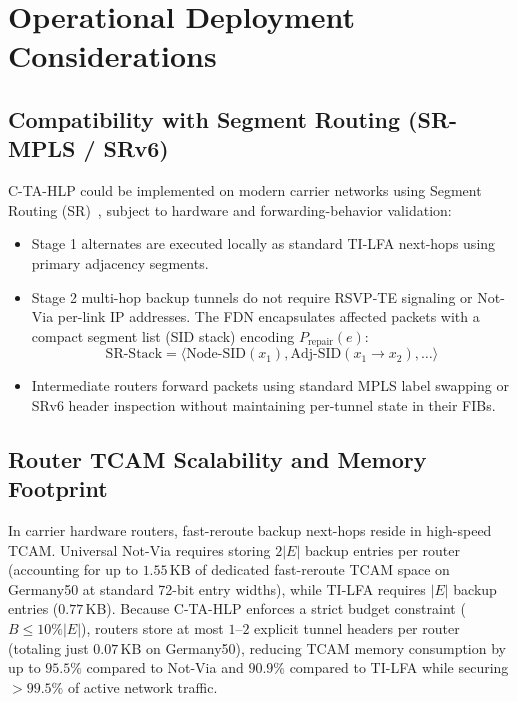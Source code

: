 \documentclass[journal]{IEEEtran}
\begin{document}
\section{Operational Deployment Considerations}

\subsection{Compatibility with Segment Routing (SR-MPLS / SRv6)}
C-TA-HLP could be implemented on modern carrier networks using Segment Routing (SR)~\cite{rfc9855,ventre2021segment,bramas2025simple}, subject to hardware and forwarding-behavior validation:
\begin{itemize}
    \item Stage 1 alternates are executed locally as standard TI-LFA next-hops using primary adjacency segments.
    \item Stage 2 multi-hop backup tunnels do not require RSVP-TE signaling or Not-Via per-link IP addresses. The FDN encapsulates affected packets with a compact segment list (SID stack) encoding $P_{\text{repair}}(e)$:
    \begin{equation}
    \text{SR-Stack} = \langle \text{Node-SID}(x_1), \text{Adj-SID}(x_1 \to x_2), \dots \rangle
    \end{equation}
    \item Intermediate routers forward packets using standard MPLS label swapping or SRv6 header inspection without maintaining per-tunnel state in their FIBs.
\end{itemize}

\subsection{Router TCAM Scalability and Memory Footprint}
In carrier hardware routers, fast-reroute backup next-hops reside in high-speed TCAM. Universal Not-Via requires storing $2|E|$ backup entries per router (accounting for up to $1.55$\,KB of dedicated fast-reroute TCAM space on Germany50 at standard 72-bit entry widths), while TI-LFA requires $|E|$ backup entries ($0.77$\,KB). Because C-TA-HLP enforces a strict budget constraint ($B \le 10\% |E|$), routers store at most $1\text{--}2$ explicit tunnel headers per router (totaling just $0.07$\,KB on Germany50), reducing TCAM memory consumption by up to $95.5\%$ compared to Not-Via and $90.9\%$ compared to TI-LFA while securing $>99.5\%$ of active network traffic.
\end{document}
